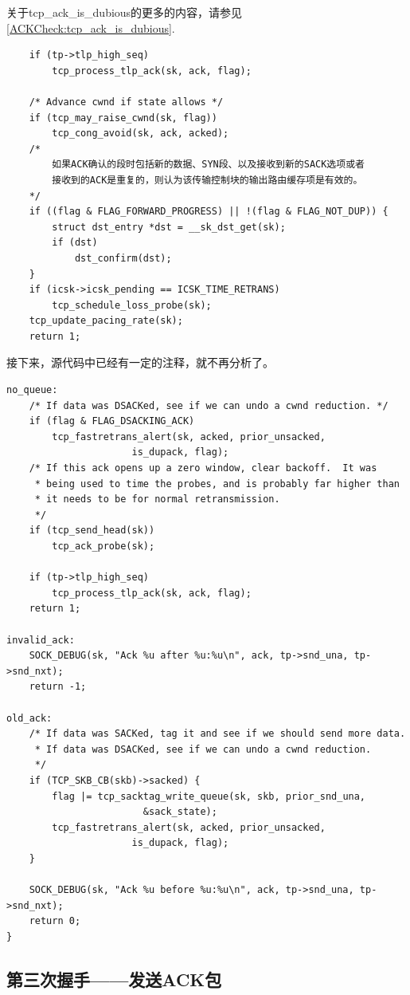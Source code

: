 	关于tcp\_ack\_is\_dubious的更多的内容，请参见\ref{ACKCheck:tcp_ack_is_dubious}.

\begin{verbatim}
	if (tp->tlp_high_seq)
		tcp_process_tlp_ack(sk, ack, flag);

	/* Advance cwnd if state allows */
	if (tcp_may_raise_cwnd(sk, flag))
		tcp_cong_avoid(sk, ack, acked);
	/*
		如果ACK确认的段时包括新的数据、SYN段、以及接收到新的SACK选项或者
		接收到的ACK是重复的，则认为该传输控制块的输出路由缓存项是有效的。
	*/
	if ((flag & FLAG_FORWARD_PROGRESS) || !(flag & FLAG_NOT_DUP)) {
		struct dst_entry *dst = __sk_dst_get(sk);
		if (dst)
			dst_confirm(dst);
	}
	if (icsk->icsk_pending == ICSK_TIME_RETRANS)
		tcp_schedule_loss_probe(sk);
	tcp_update_pacing_rate(sk);
	return 1;
\end{verbatim}

	接下来，源代码中已经有一定的注释，就不再分析了。
\begin{verbatim}
no_queue:
	/* If data was DSACKed, see if we can undo a cwnd reduction. */
	if (flag & FLAG_DSACKING_ACK)
		tcp_fastretrans_alert(sk, acked, prior_unsacked,
				      is_dupack, flag);
	/* If this ack opens up a zero window, clear backoff.  It was
	 * being used to time the probes, and is probably far higher than
	 * it needs to be for normal retransmission.
	 */
	if (tcp_send_head(sk))
		tcp_ack_probe(sk);

	if (tp->tlp_high_seq)
		tcp_process_tlp_ack(sk, ack, flag);
	return 1;

invalid_ack:
	SOCK_DEBUG(sk, "Ack %u after %u:%u\n", ack, tp->snd_una, tp->snd_nxt);
	return -1;

old_ack:
	/* If data was SACKed, tag it and see if we should send more data.
	 * If data was DSACKed, see if we can undo a cwnd reduction.
	 */
	if (TCP_SKB_CB(skb)->sacked) {
		flag |= tcp_sacktag_write_queue(sk, skb, prior_snd_una,
						&sack_state);
		tcp_fastretrans_alert(sk, acked, prior_unsacked,
				      is_dupack, flag);
	}

	SOCK_DEBUG(sk, "Ack %u before %u:%u\n", ack, tp->snd_una, tp->snd_nxt);
	return 0;
}
\end{verbatim} 
	\subsection{第三次握手——发送ACK包}
		\label{Client:send_ack}
